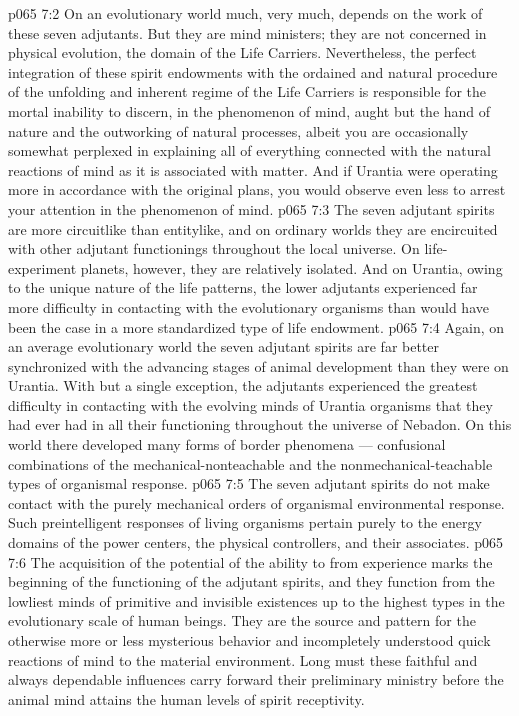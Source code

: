 \vs p065 7:2 On an evolutionary world much, very much, depends on the work of these seven adjutants. But they are mind ministers; they are not concerned in physical evolution, the domain of the Life Carriers. Nevertheless, the perfect integration of these spirit endowments with the ordained and natural procedure of the unfolding and inherent regime of the Life Carriers is responsible for the mortal inability to discern, in the phenomenon of mind, aught but the hand of nature and the outworking of natural processes, albeit you are occasionally somewhat perplexed in explaining all of everything connected with the natural reactions of mind as it is associated with matter. And if Urantia were operating more in accordance with the original plans, you would observe even less to arrest your attention in the phenomenon of mind.
\vs p065 7:3 The seven adjutant spirits are more circuitlike than entitylike, and on ordinary worlds they are encircuited with other adjutant functionings throughout the local universe. On life\hyp{}experiment planets, however, they are relatively isolated. And on Urantia, owing to the unique nature of the life patterns, the lower adjutants experienced far more difficulty in contacting with the evolutionary organisms than would have been the case in a more standardized type of life endowment.
\vs p065 7:4 Again, on an average evolutionary world the seven adjutant spirits are far better synchronized with the advancing stages of animal development than they were on Urantia. With but a single exception, the adjutants experienced the greatest difficulty in contacting with the evolving minds of Urantia organisms that they had ever had in all their functioning throughout the universe of Nebadon. On this world there developed many forms of border phenomena --- confusional combinations of the mechanical\hyp{}nonteachable and the nonmechanical\hyp{}teachable types of organismal response.
\vs p065 7:5 The seven adjutant spirits do not make contact with the purely mechanical orders of organismal environmental response. Such preintelligent responses of living organisms pertain purely to the energy domains of the power centers, the physical controllers, and their associates.
\vs p065 7:6 The acquisition of the potential of the ability to  from experience marks the beginning of the functioning of the adjutant spirits, and they function from the lowliest minds of primitive and invisible existences up to the highest types in the evolutionary scale of human beings. They are the source and pattern for the otherwise more or less mysterious behavior and incompletely understood quick reactions of mind to the material environment. Long must these faithful and always dependable influences carry forward their preliminary ministry before the animal mind attains the human levels of spirit receptivity.
